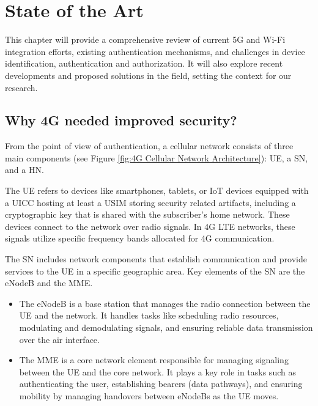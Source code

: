 \chapter{State of the Art}
\label{chapter:State of the Art}

\begin{introduction}
This chapter will provide a comprehensive review of current \ac{5G} and Wi-Fi integration efforts, existing authentication mechanisms, and challenges in device identification, authentication and authorization. It will also explore recent developments and proposed solutions in the field, setting the context for our research.
\end{introduction}

\section{Why \acs{4G} needed improved security?}

From the point of view of authentication, a cellular network consists of three main components (see Figure \ref{fig:4G Cellular Network Architecture}): \ac{UE}, a \ac{SN}, and a \ac{HN}.

The \ac{UE} refers to devices like smartphones, tablets, or IoT devices equipped with a \ac{UICC}  hosting at least a \ac{USIM} storing security related artifacts, including a cryptographic key that is shared with the subscriber’s home network. These devices connect to the network over radio signals. In \acf{4G} \ac{LTE} networks, these signals utilize specific frequency bands allocated for \ac{4G} communication.

The \ac{SN} includes network components that establish communication and provide services to the \ac{UE} in a specific geographic area. Key elements of the \ac{SN} are the \ac{eNodeB} and the \ac{MME}.

\begin{itemize}
    \item{
        The \ac{eNodeB} is a base station that manages the radio connection between the \ac{UE} and the network. It handles tasks like scheduling radio resources, modulating and demodulating signals, and ensuring reliable data transmission over the air interface.
    }
    \item {
        The \ac{MME} is a core network element responsible for managing signaling between the \ac{UE} and the core network. It plays a key role in tasks such as authenticating the user, establishing bearers (data pathways), and ensuring mobility by managing handovers between \acp{eNodeB} as the \ac{UE} moves.
    }
\end{itemize}

